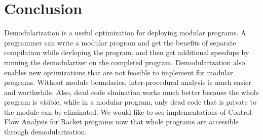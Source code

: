 \chapter{Conclusion}
\label{chap:conclusion}

Demodularization is a useful optimization for deploying modular programs. 
A programmer can write a modular program and get the benefits of separate compilation while devloping the program, and then get additional speedups by running the demodularizer on the completed program.
Demodularization also enables new optimizations that are not feasible to implement for modular programs.
Without module boundaries, inter-procedural analysis is much easier and worthwhile.
Also, dead code elmination works much better because the whole program is visible, while in a modular program, only dead code that is private to the module can be eliminated.
We would like to see implementations of Control-Flow Analysis for Racket programs now that whole programs are accessible through demodularization.

